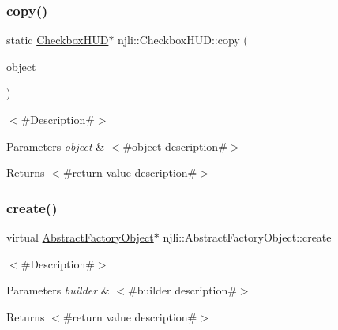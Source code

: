 \subsubsection{\texorpdfstring{copy()}{copy()}}
{\footnotesize\ttfamily static \mbox{\hyperlink{classnjli_1_1_checkbox_h_u_d}{Checkbox\+H\+UD}}$\ast$ njli\+::\+Checkbox\+H\+U\+D\+::copy (\begin{DoxyParamCaption}\item[{const \mbox{\hyperlink{classnjli_1_1_checkbox_h_u_d}{Checkbox\+H\+UD}} \&}]{object }\end{DoxyParamCaption})\hspace{0.3cm}{\ttfamily [static]}}

$<$\#\+Description\#$>$


\begin{DoxyParams}{Parameters}
{\em object} & $<$\#object description\#$>$\\
\hline
\end{DoxyParams}
\begin{DoxyReturn}{Returns}
$<$\#return value description\#$>$ 
\end{DoxyReturn}
\mbox{\label{classnjli_1_1_checkbox_h_u_d_a83a8876ae63b92804004cf3febe76573}} 
\subsubsection{\texorpdfstring{create()}{create()}\hspace{0.1cm}{\footnotesize\ttfamily [1/3]}}
{\footnotesize\ttfamily virtual \mbox{\hyperlink{classnjli_1_1_abstract_factory_object}{Abstract\+Factory\+Object}}$\ast$ njli\+::\+Abstract\+Factory\+Object\+::create}

$<$\#\+Description\#$>$


\begin{DoxyParams}{Parameters}
{\em builder} & $<$\#builder description\#$>$\\
\hline
\end{DoxyParams}
\begin{DoxyReturn}{Returns}
$<$\#return value description\#$>$ 
\end{DoxyReturn}
\mbox{\label{classnjli_1_1_checkbox_h_u_d_ad82c2050436a46588852bfdce166dd14}} 
